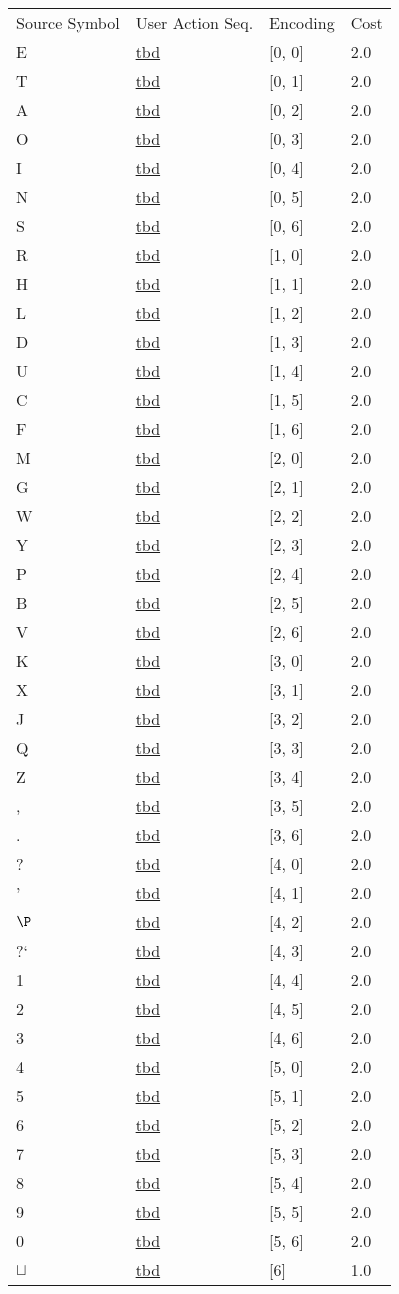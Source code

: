 \documentclass[12pt]{article}
\begin{document}
\begin{tabular}{l l l l}
Source Symbol	&	User Action Seq.	&	Encoding	&	Cost\\
E	&	\url{tbd}	&	[0, 0]	&	2.0\\
T	&	\url{tbd}	&	[0, 1]	&	2.0\\
A	&	\url{tbd}	&	[0, 2]	&	2.0\\
O	&	\url{tbd}	&	[0, 3]	&	2.0\\
I	&	\url{tbd}	&	[0, 4]	&	2.0\\
N	&	\url{tbd}	&	[0, 5]	&	2.0\\
S	&	\url{tbd}	&	[0, 6]	&	2.0\\
R	&	\url{tbd}	&	[1, 0]	&	2.0\\
H	&	\url{tbd}	&	[1, 1]	&	2.0\\
L	&	\url{tbd}	&	[1, 2]	&	2.0\\
D	&	\url{tbd}	&	[1, 3]	&	2.0\\
U	&	\url{tbd}	&	[1, 4]	&	2.0\\
C	&	\url{tbd}	&	[1, 5]	&	2.0\\
F	&	\url{tbd}	&	[1, 6]	&	2.0\\
M	&	\url{tbd}	&	[2, 0]	&	2.0\\
G	&	\url{tbd}	&	[2, 1]	&	2.0\\
W	&	\url{tbd}	&	[2, 2]	&	2.0\\
Y	&	\url{tbd}	&	[2, 3]	&	2.0\\
P	&	\url{tbd}	&	[2, 4]	&	2.0\\
B	&	\url{tbd}	&	[2, 5]	&	2.0\\
V	&	\url{tbd}	&	[2, 6]	&	2.0\\
K	&	\url{tbd}	&	[3, 0]	&	2.0\\
X	&	\url{tbd}	&	[3, 1]	&	2.0\\
J	&	\url{tbd}	&	[3, 2]	&	2.0\\
Q	&	\url{tbd}	&	[3, 3]	&	2.0\\
Z	&	\url{tbd}	&	[3, 4]	&	2.0\\
,	&	\url{tbd}	&	[3, 5]	&	2.0\\
.	&	\url{tbd}	&	[3, 6]	&	2.0\\
?	&	\url{tbd}	&	[4, 0]	&	2.0\\
'	&	\url{tbd}	&	[4, 1]	&	2.0\\
$\P$	&	\url{tbd}	&	[4, 2]	&	2.0\\
?`	&	\url{tbd}	&	[4, 3]	&	2.0\\
1	&	\url{tbd}	&	[4, 4]	&	2.0\\
2	&	\url{tbd}	&	[4, 5]	&	2.0\\
3	&	\url{tbd}	&	[4, 6]	&	2.0\\
4	&	\url{tbd}	&	[5, 0]	&	2.0\\
5	&	\url{tbd}	&	[5, 1]	&	2.0\\
6	&	\url{tbd}	&	[5, 2]	&	2.0\\
7	&	\url{tbd}	&	[5, 3]	&	2.0\\
8	&	\url{tbd}	&	[5, 4]	&	2.0\\
9	&	\url{tbd}	&	[5, 5]	&	2.0\\
0	&	\url{tbd}	&	[5, 6]	&	2.0\\
$\sqcup$	&	\url{tbd}	&	[6]	&	1.0\\
\end{tabular}
\end{document}
